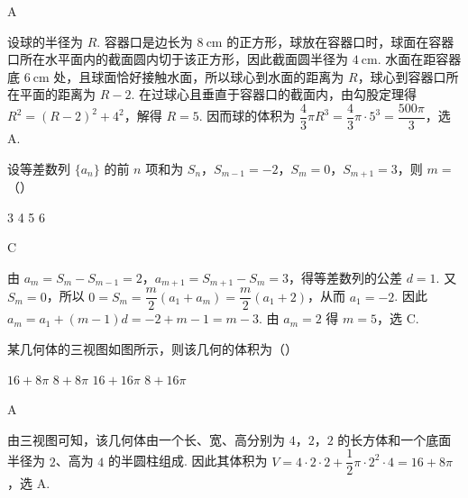 \begin{answer}
A
\end{answer}

\begin{solution}
设球的半径为 \(R\). 容器口是边长为 \(8\mathrm{~cm}\) 的正方形，球放在容器口时，球面在容器口所在水平面内的截面圆内切于该正方形，因此截面圆半径为 \(4\mathrm{~cm}\). 水面在距容器底 \(6\mathrm{~cm}\) 处，且球面恰好接触水面，所以球心到水面的距离为 \(R\)，球心到容器口所在平面的距离为 \(R-2\). 在过球心且垂直于容器口的截面内，由勾股定理得
\(R^2=(R-2)^2+4^2\)，解得 \(R=5\). 因而球的体积为 \(\dfrac43\pi R^3=\dfrac43\pi\cdot5^3=\dfrac{500\pi}{3}\)，选 A.
\end{solution}

\begin{problem}
设等差数列 \(\{a_{n}\}\) 的前 \(n\) 项和为 \(S_{n}\)，\(S_{m-1} = -2\)，\(S_{m} = 0\)，\(S_{m+1} = 3\)，则 \(m =\)（\quad）

\choices
    {3}
    {4}
    {5}
    {6}
\end{problem}

\begin{answer}
C
\end{answer}

\begin{solution}
由 \(a_m=S_m-S_{m-1}=2\)，\(a_{m+1}=S_{m+1}-S_m=3\)，得等差数列的公差 \(d=1\). 又 \(S_m=0\)，所以
\(0=S_m=\dfrac m2(a_1+a_m)=\dfrac m2(a_1+2)\)，从而 \(a_1=-2\). 因此 \(a_m=a_1+(m-1)d=-2+m-1=m-3\). 由 \(a_m=2\) 得 \(m=5\)，选 C.
\end{solution}

\begin{problem}
某几何体的三视图如图所示，则该几何的体积为（\quad）


\choices
    {\(16 + 8\pi\)}
    {\(8 + 8\pi\)}
    {\(16 + 16\pi\)}
    {\(8 + 16\pi\)}
\end{problem}

\begin{answer}
A
\end{answer}

\begin{solution}
由三视图可知，该几何体由一个长、宽、高分别为 \(4\)，\(2\)，\(2\) 的长方体和一个底面半径为 \(2\)、高为 \(4\) 的半圆柱组成. 因此其体积为
\(V=4\cdot2\cdot2+\dfrac12\pi\cdot2^2\cdot4=16+8\pi\)，选 A.
\end{solution}

